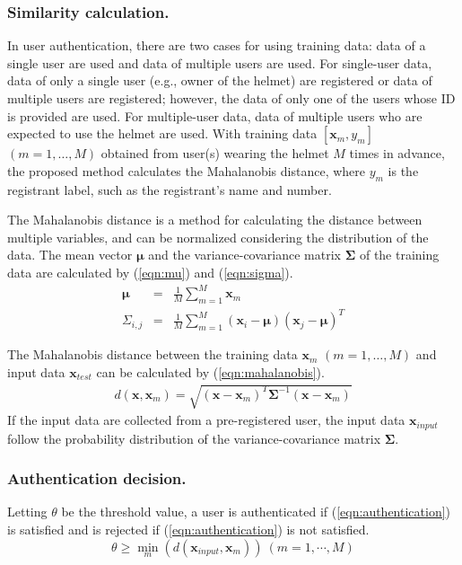 \documentclass[english,preprint,JIP]{ipsj}
\begin{document}
\subsubsection{Similarity calculation.}
In user authentication, there are two cases for using training data: data of a single user are used and data of multiple users are used. For single-user data, data of only a single user (e.g., owner of the helmet) are registered or data of multiple users are registered; however, the data of only one of the users whose ID is provided are used. For multiple-user data, data of multiple users who are expected to use the helmet are used. With training data $[\bm{x}_m,y_m]$ $(m=1,\dots, M)$ obtained from user(s) wearing the helmet $M$ times in advance, the proposed method calculates the Mahalanobis distance, where $y_m$ is the registrant label, such as the registrant's name and number.\par

The Mahalanobis distance is a method for calculating the distance between multiple variables, and can be normalized considering the distribution of the data. The mean vector $\bm{\mu}$ and the variance-covariance matrix $\bm{\Sigma}$ of the training data are calculated by (\ref{eqn:mu}) and (\ref{eqn:sigma}).
\begin{eqnarray}
\label{eqn:mu}
  \bm{\mu} &=& \frac{1}{M}\sum_{m=1}^{M}\bm{x}_m \\
\label{eqn:sigma}
  \Sigma_{i,j} &=& \frac{1}{M}\sum_{m=1}^{M}(\bm{x}_i-\bm{\mu})(\bm{x}_j-\bm{\mu})^T
\end{eqnarray}
 
The Mahalanobis distance between the training data $\bm{x}_m$ $(m=1,\dots, M)$ and input data $\bm{x}_{test}$ can be calculated by (\ref{eqn:mahalanobis}).
\begin{eqnarray}
\label{eqn:mahalanobis}
  d(\bm{x},\bm{x}_m) = \sqrt{(\bm{x}-\bm{x}_m)^{T}\bm{\Sigma}^{-1}(\bm{x}-\bm{x}_m)}
\end{eqnarray}
If the input data are collected from a pre-registered user, the input data $\bm{x}_{input}$ follow the probability distribution of the variance-covariance matrix $\bm{\Sigma}$.


\subsubsection{Authentication decision.}
Letting $\theta$ be the threshold value, a user is authenticated if (\ref{eqn:authentication}) is satisfied and is rejected if (\ref{eqn:authentication}) is not satisfied.
\begin{equation}
\label{eqn:authentication}
  \theta \geq \min_m(d(\bm{x}_{input},\bm{x}_m))~(m=1,\cdots,M)
\end{equation}
\end{document}
